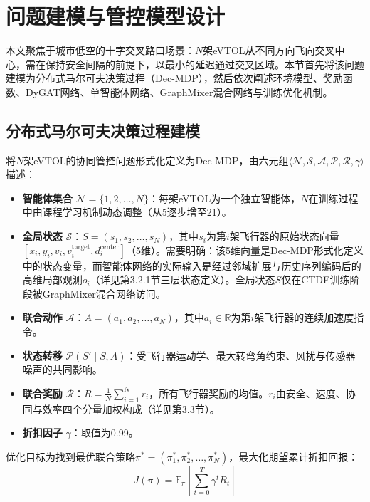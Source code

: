\documentclass[12pt,a4paper,UTF8]{ctexart}
\begin{document}
\section{问题建模与管控模型设计}

本文聚焦于城市低空的十字交叉路口场景：$N$架eVTOL从不同方向飞向交叉中心，需在保持安全间隔的前提下，以最小的延迟通过交叉区域。本节首先将该问题建模为分布式马尔可夫决策过程（Dec-MDP），然后依次阐述环境模型、奖励函数、DyGAT网络、单智能体网络、GraphMixer混合网络与训练优化机制。

\subsection{分布式马尔可夫决策过程建模}

将$N$架eVTOL的协同管控问题形式化定义为Dec-MDP，由六元组$\langle \mathcal{N}, \mathcal{S}, \mathcal{A}, \mathcal{P}, \mathcal{R}, \gamma \rangle$描述：

\begin{itemize}
    \item \textbf{智能体集合} $\mathcal{N} = \{1, 2, \ldots, N\}$：每架eVTOL为一个独立智能体，$N$在训练过程中由课程学习机制动态调整（从5逐步增至21）。
    \item \textbf{全局状态} $\mathcal{S}$：$S = (s_1, s_2, \ldots, s_N)$，其中$s_i$为第$i$架飞行器的原始状态向量$[x_i, y_i, v_i, v_i^{\text{target}}, d_i^{\text{center}}]$（5维）。需要明确：该5维向量是Dec-MDP形式化定义中的状态变量，而智能体网络的实际输入是经过邻域扩展与历史序列编码后的高维局部观测$o_i$（详见第3.2.1节三层状态定义）。全局状态$S$仅在CTDE训练阶段被GraphMixer混合网络访问。
    \item \textbf{联合动作} $\mathcal{A}$：$A = (a_1, a_2, \ldots, a_N)$，其中$a_i \in \mathbb{R}$为第$i$架飞行器的连续加速度指令。
    \item \textbf{状态转移} $\mathcal{P}(S' \mid S, A)$：受飞行器运动学、最大转弯角约束、风扰与传感器噪声的共同影响。
    \item \textbf{联合奖励} $\mathcal{R}$：$R = \frac{1}{N}\sum_{i=1}^{N} r_i$，所有飞行器奖励的均值。$r_i$由安全、速度、协同与效率四个分量加权构成（详见第3.3节）。
    \item \textbf{折扣因子} $\gamma$：取值为0.99。
\end{itemize}

优化目标为找到最优联合策略$\pi^* = (\pi_1^*, \pi_2^*, \ldots, \pi_N^*)$，最大化期望累计折扣回报：
\begin{equation}
    J(\pi) = \mathbb{E}_{\pi}\left[\sum_{t=0}^{T} \gamma^t R_t\right]
\end{equation}
\end{document}
